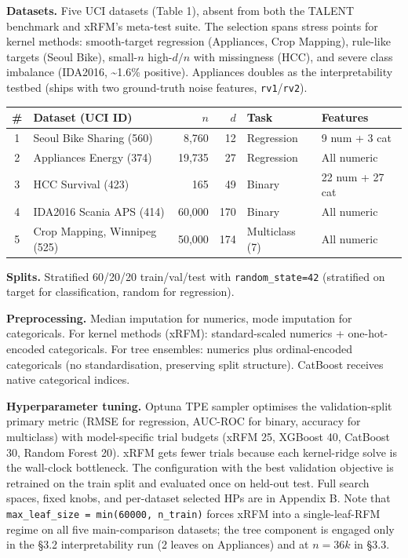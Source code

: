\documentclass[
  11pt,
  onecolumn]{article}
\begin{document}
\textbf{Datasets.} Five UCI datasets (Table 1), absent from both the
TALENT benchmark and xRFM's meta-test suite. The selection spans stress
points for kernel methods: smooth-target regression (Appliances, Crop
Mapping), rule-like targets (Seoul Bike), small-\(n\) high-\(d/n\) with
missingness (HCC), and severe class imbalance (IDA2016,
\textasciitilde1.6\% positive). Appliances doubles as the
interpretability testbed (ships with two ground-truth noise features,
\texttt{rv1}/\texttt{rv2}).

\begin{center}
\begin{tabular}{@{}clrrll@{}}
\toprule
\# & Dataset (UCI ID) & \(n\) & \(d\) & Task & Features \\
\midrule
1 & Seoul Bike Sharing (560)     & 8,760  & 12  & Regression     & 9 num + 3 cat \\
2 & Appliances Energy (374)      & 19,735 & 27  & Regression     & All numeric \\
3 & HCC Survival (423)           & 165    & 49  & Binary         & 22 num + 27 cat \\
4 & IDA2016 Scania APS (414)     & 60,000 & 170 & Binary         & All numeric \\
5 & Crop Mapping, Winnipeg (525) & 50,000 & 174 & Multiclass (7) & All numeric \\
\bottomrule
\end{tabular}
\end{center}

\textbf{Splits.} Stratified 60/20/20 train/val/test with
\texttt{random\_state=42} (stratified on target for classification,
random for regression).

\textbf{Preprocessing.} Median imputation for numerics, mode imputation
for categoricals. For kernel methods (xRFM): standard-scaled numerics +
one-hot-encoded categoricals. For tree ensembles: numerics plus
ordinal-encoded categoricals (no standardisation, preserving split
structure). CatBoost receives native categorical indices.

\textbf{Hyperparameter tuning.} Optuna TPE sampler optimises the
validation-split primary metric (RMSE for regression, AUC-ROC for
binary, accuracy for multiclass) with model-specific trial budgets
(xRFM 25, XGBoost 40, CatBoost 30, Random Forest 20). xRFM gets fewer
trials because each kernel-ridge solve is the wall-clock bottleneck.
The configuration with the best validation objective is retrained on
the train split and evaluated once on held-out test. Full search
spaces, fixed knobs, and per-dataset selected HPs are in Appendix B.
Note that \texttt{max\_leaf\_size = min(60000, n\_train)} forces xRFM
into a single-leaf-RFM regime on all five main-comparison datasets;
the tree component is engaged only in the §3.2 interpretability run
(2 leaves on Appliances) and at \(n=36k\) in §3.3.
\end{document}

